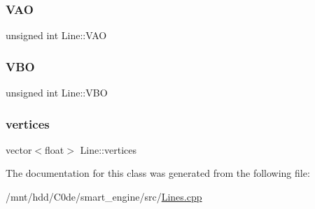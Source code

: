 \mbox{\label{classLine_aa17e21db4b9157d666a0c18c18552018}} 
\subsubsection{\texorpdfstring{V\+AO}{VAO}}
{\footnotesize\ttfamily unsigned int Line\+::\+V\+AO\hspace{0.3cm}{\ttfamily [private]}}

\mbox{\label{classLine_a24a4150cae9dbaa98d0f21c6be6c7755}} 
\subsubsection{\texorpdfstring{V\+BO}{VBO}}
{\footnotesize\ttfamily unsigned int Line\+::\+V\+BO\hspace{0.3cm}{\ttfamily [private]}}

\mbox{\label{classLine_a161c9dfa204c9758a47b58d9902d5c2c}} 
\subsubsection{\texorpdfstring{vertices}{vertices}}
{\footnotesize\ttfamily vector$<$float$>$ Line\+::vertices\hspace{0.3cm}{\ttfamily [private]}}



The documentation for this class was generated from the following file\+:\begin{DoxyCompactItemize}
\item 
/mnt/hdd/\+C0de/smart\+\_\+engine/src/\hyperlink{Lines_8cpp}{Lines.\+cpp}\end{DoxyCompactItemize}

